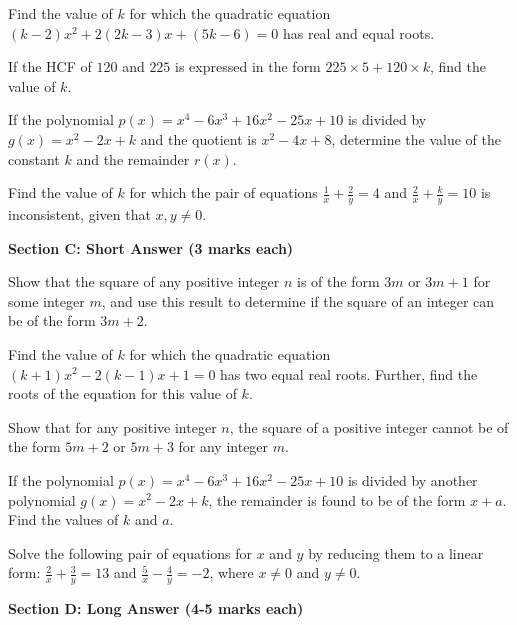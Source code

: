 \documentclass[12pt,a4paper]{exam}
\begin{document}
\begin{questions}
\question[2] Find the value of $k$ for which the quadratic equation $(k-2)x^2 + 2(2k-3)x + (5k-6) = 0$ has real and equal roots.
\vspace{0.15cm}

\question[2] If the HCF of $120$ and $225$ is expressed in the form $225 \times 5 + 120 \times k$, find the value of $k$.
\vspace{0.15cm}

\question[2] If the polynomial $p(x) = x^4 - 6x^3 + 16x^2 - 25x + 10$ is divided by $g(x) = x^2 - 2x + k$ and the quotient is $x^2 - 4x + 8$, determine the value of the constant $k$ and the remainder $r(x)$.
\vspace{0.15cm}

\question[2] Find the value of $k$ for which the pair of equations $\frac{1}{x} + \frac{2}{y} = 4$ and $\frac{2}{x} + \frac{k}{y} = 10$ is inconsistent, given that $x, y \neq 0$.
\vspace{0.15cm}

\end{questions}
\bigskip
\noindent\textbf{\large Section C: Short Answer (3 marks each)}

\begin{questions}
\question[3] Show that the square of any positive integer $n$ is of the form $3m$ or $3m + 1$ for some integer $m$, and use this result to determine if the square of an integer can be of the form $3m + 2$.
\vspace{0.15cm}

\question[3] Find the value of $k$ for which the quadratic equation $(k+1)x^2 - 2(k-1)x + 1 = 0$ has two equal real roots. Further, find the roots of the equation for this value of $k$.
\vspace{0.15cm}

\question[3] Show that for any positive integer $n$, the square of a positive integer cannot be of the form $5m + 2$ or $5m + 3$ for any integer $m$.
\vspace{0.15cm}

\question[3] If the polynomial $p(x) = x^4 - 6x^3 + 16x^2 - 25x + 10$ is divided by another polynomial $g(x) = x^2 - 2x + k$, the remainder is found to be of the form $x + a$. Find the values of $k$ and $a$.
\vspace{0.15cm}

\question[3] Solve the following pair of equations for $x$ and $y$ by reducing them to a linear form: $\frac{2}{x} + \frac{3}{y} = 13$ and $\frac{5}{x} - \frac{4}{y} = -2$, where $x \neq 0$ and $y \neq 0$.
\vspace{0.15cm}

\end{questions}
\bigskip
\noindent\textbf{\large Section D: Long Answer (4-5 marks each)}
\end{document}
